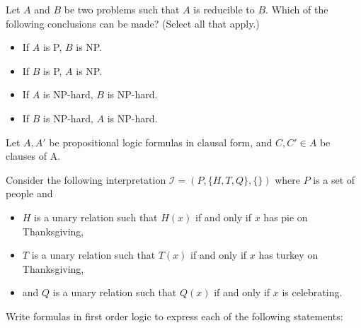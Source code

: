 \documentclass[addpoints]{exam}
\begin{document}
\begin{questions}
\vspace{2cm}

	
	\question[4]
	Let $A$ and $B$ be two problems such that $A$ is reducible to $B$. Which of the following conclusions can be made? (Select all that apply.)
	
	\begin{itemize}
		\renewcommand{\labelitemi}{$\square$}
		\renewcommand{\labelitemii}{$\square$}
		\renewcommand{\labelitemiii}{$\square$}
		\renewcommand{\labelitemiv}{$\square$}
		\item If $A$ is P, $B$ is NP.
		\item If $B$ is P, $A$ is NP.
		\item If $A$ is NP-hard, $B$ is NP-hard.
		\item If $B$ is NP-hard, $A$ is NP-hard.
	\end{itemize}
	
	\vspace{5mm}


\question[4]

Let $A,A'$ be propositional logic formulas in clausal form, and $ C, C' \in A$ be clauses of A.


\vspace{.5cm}



\question
Consider the following interpretation $\mathscr{I} = (P, \{H, T, Q\}, \{\})$ where  $P$ is a set of people and
\begin{itemize}
\item $H$ is a unary
relation such that $H(x)$ if and only if $x$ has pie on Thanksgiving,
\item $T$ is a unary
relation such that $T(x)$ if and only if $x$ has turkey on Thanksgiving,
\item and $Q$ is a unary relation such that $Q(x)$ if and
only if $x$ is celebrating.
\end{itemize}  Write formulas in first order logic to express each of the following statements:


\end{questions}
\end{document}
